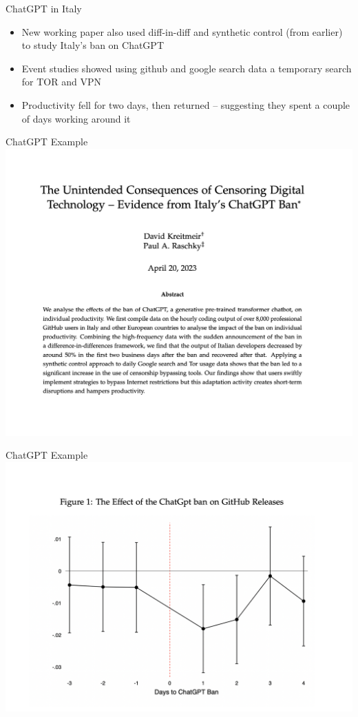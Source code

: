 \documentclass{beamer}
\begin{document}
\begin{frame}{ChatGPT in Italy}

\begin{itemize}

\item New working paper also used diff-in-diff and synthetic control (from earlier) to study Italy's ban on ChatGPT
\item Event studies showed using github and google search data a temporary search for TOR and VPN
\item Productivity fell for two days, then returned -- suggesting they spent a couple of days working around it

\end{itemize}

\end{frame}

\begin{frame}{ChatGPT Example}
             \includegraphics[scale=0.35]{./lecture_includes/gpt_title}

\end{frame}

\begin{frame}{ChatGPT Example}
             \includegraphics[scale=0.45]{./lecture_includes/gpt_github}

\end{frame}
\end{document}

